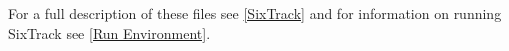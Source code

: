For a full description of these files see
\href{../Introduction/bibliography.html#SixTrack}{[SixTrack]} and for
information on running SixTrack see
\href{../Introduction/bibliography.html#SixTrack_Run_Environment}{[Run
    Environment]}.  

 
